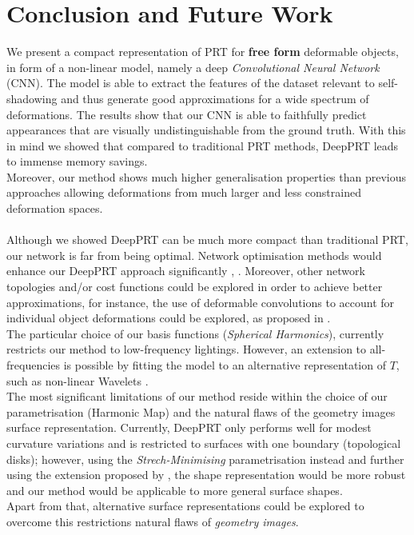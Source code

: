 \section{Conclusion and Future Work}
We present a compact representation of PRT for \textbf{free form} deformable objects, in form of a non-linear model, namely a deep \textit{Convolutional Neural Network} (CNN).  The model is able to extract the features of the dataset relevant to self-shadowing and thus generate good approximations for a wide spectrum of deformations. The results show that our CNN is able to faithfully predict appearances that are visually undistinguishable from the ground truth.  With this in mind we showed that compared to traditional PRT methods, DeepPRT leads to immense memory savings.
\\ 
Moreover, our method shows much higher generalisation properties than previous approaches allowing deformations from much larger and less constrained deformation spaces.\\
\\
Although we showed DeepPRT can be much more compact than traditional PRT, our network is far from being optimal. Network optimisation methods would enhance our DeepPRT approach significantly \cite{Survey_NN_Compression}, \cite{Deep_Compression}.
Moreover, other network topologies and/or cost functions could be explored in order to achieve  better approximations, for instance, the use of deformable convolutions \cite{DeformableCNN} to account for individual object deformations could be explored, as proposed in \cite{Deformable_UNet}.
\\
The particular choice of our basis functions (\textit{Spherical Harmonics}), currently restricts our method to low-frequency lightings. However, an extension to all-frequencies is possible by fitting the model to an alternative representation of $T$, such as non-linear Wavelets \cite{AllFrequencyPRT}.
\\
The most significant limitations of our method reside within the choice of our parametrisation (Harmonic Map) and the natural flaws of the geometry images surface representation.  Currently, DeepPRT only performs well for modest curvature variations and is restricted to surfaces with one boundary (topological disks); however, using the \textit{Strech-Minimising} parametrisation instead and further using the extension proposed by \cite{Spherical_Parametrization}, the shape representation would be more robust and our method would be applicable to more general surface shapes. \\
Apart from that, alternative surface representations could be explored to overcome this restrictions natural flaws of \textit{geometry images}. 

